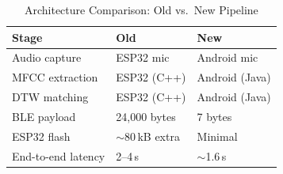 \begin{table}[H]
\caption{Architecture Comparison: Old vs.\ New Pipeline}
\centering
\begin{tabular}{lll}
\toprule
\textbf{Stage} & \textbf{Old} & \textbf{New} \\
\midrule
Audio capture      & ESP32 mic          & Android mic    \\
MFCC extraction    & ESP32 (C++)        & Android (Java) \\
DTW matching       & ESP32 (C++)        & Android (Java) \\
BLE payload        & 24{,}000 bytes     & 7 bytes        \\
ESP32 flash        & $\sim$80\,kB extra & Minimal        \\
End-to-end latency & 2--4\,s            & $\sim$1.6\,s   \\
\bottomrule
\end{tabular}
\label{tab:arch}
\end{table}